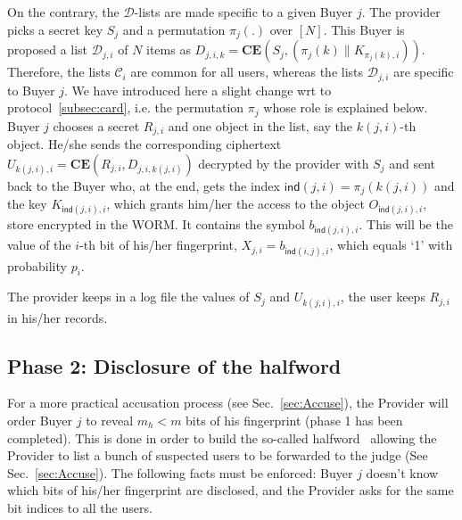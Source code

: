 \documentclass{article}
\def\ind{\mathsf{ind}}
\begin{document}
On the contrary, the $\mathcal{D}$-lists are made specific to a given
Buyer $j$. The provider picks a secret key $S_{j}$ and a permutation
$\pi_{j}(.)$ over $[N]$.
This Buyer is proposed a list $\mathcal{D}_{j,i}$ of $N$ items as
$D_{j,i,k}=\textbf{CE}(S_j,(\pi_{j}(k)\|K_{\pi_{j}(k),i}))$.
Therefore, the lists $\mathcal{C}_i$ are common for all users, whereas
the lists $\mathcal{D}_{j,i}$ are specific to Buyer $j$. We have
introduced here a slight change wrt to protocol~\ref{subsec:card},
i.e. the permutation $\pi_{j}$ whose role is explained below.  Buyer
$j$ chooses a secret $R_{j,i}$ and one object in the list, say the
$k(j,i)$-th object. He/she sends the corresponding ciphertext
$U_{k(j,i),i}=\textbf{CE}(R_{j,i},D_{j,i,k(j,i)})$ decrypted by the
provider with $S_j$ and sent back to the Buyer who, at the end, gets
the index $\ind(j,i)=\pi_{j}(k(j,i))$ and the key $K_{\ind(j,i),i}$,
which grants him/her the access to the object $O_{\ind(j,i),i}$, store encrypted in the WORM.
It contains the symbol $b_{\ind(j,i),i}$. This will be the value of the
$i$-th bit of his/her fingerprint, $X_{j,i} = b_{\ind(i,j),i}$, which
equals `1' with probability $p_i$.

The provider keeps in a log file the values of $S_j$ and
$U_{k(j,i),i}$, the user keeps $R_{j,i}$ in his/her records.


\subsection{Phase 2: Disclosure of the halfword}
\label{subsec:halfword}

For a more practical accusation process (see Sec.~\ref{sec:Accuse}),
the Provider will order Buyer $j$ to reveal $m_h<m$ bits of his
fingerprint (phase 1 has been completed). This is done in order to build the so-called
halfword~\cite{PfitzmannAsym} allowing the Provider to list a bunch of
suspected users to be forwarded to the judge (See
Sec.~\ref{sec:Accuse}).  The following facts must be enforced: Buyer
$j$ doesn't know which bits of his/her fingerprint are disclosed, and
the Provider asks for the same bit indices to all the users.
  
\end{document}
